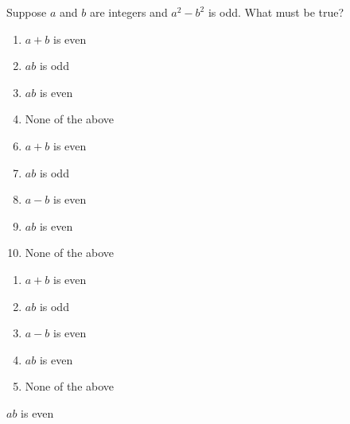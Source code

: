 


  Suppose $a$ and $b$ are integers and $a^{2}-b^{2}$ is odd.  What must be true?  



\ifsat
	\begin{enumerate}[label=\Alph*)]
		\item   $a+b$ is even
		\item  $ab$ is odd
		\item $ab$ is even%
		\item  None of the above
	\end{enumerate}
\else
\fi

\ifacteven
	\begin{enumerate}[label=\textbf{\Alph*.},itemsep=\fill,align=left]
		\setcounter{enumii}{5}
		\item   $a+b$ is even
		\item  $ab$ is odd
		\item $a-b$ is even
		\addtocounter{enumii}{1}
		\item $ab$ is even%
		\item  None of the above
	\end{enumerate}
\else
\fi

\ifactodd
	\begin{enumerate}[label=\textbf{\Alph*.},itemsep=\fill,align=left]
		\item   $a+b$ is even
		\item  $ab$ is odd
		\item $a-b$ is even
		\item $ab$ is even%
		\item  None of the above
	\end{enumerate}
\else
\fi

\ifgridin
 $ab$ is even%
		
\else
\fi

